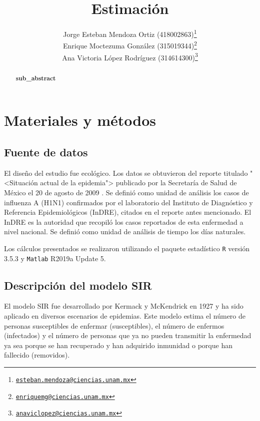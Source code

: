 \documentclass[12pt]{article}
\newcommand{\absdiv}[1]{%
  \par\addvspace{.5\baselineskip}%
  \noindent\textbf{#1}\quad\ignorespaces
}
\begin{document}
	\title{Estimación}
	\author{Jorge Esteban Mendoza Ortiz (418002863)\thanks{\href{mailto:esteban.mendoza@ciencias.unam.mx}{\nolinkurl{esteban.mendoza@ciencias.unam.mx}}} \\
	Enrique Moctezuma González (315019344)\thanks{\href{mailto:enriquemg@ciencias.unam.mx}{\nolinkurl{enriquemg@ciencias.unam.mx}}}\\
	Ana Victoria López Rodríguez (314614300)\thanks{\href{anaviclopez@ciencias.unam.mx}{\nolinkurl{anaviclopez@ciencias.unam.mx}}}}
	\date{}
	\maketitle
	
	\begin{abstract}
	\absdiv{sub\_abstract}
	\end{abstract}
	
	\noindent 
	
	\section{Materiales y métodos}
	\subsection*{Fuente de datos}
	
	El diseño del estudio fue ecológico. Los datos se obtuvieron del reporte titulado "<Situación actual de la epidemia"> publicado por la Secretaría de Salud de México el 20 de agosto de 2009 \cite{Salud2009}. Se definió como unidad de análisis los casos de influenza A (H1N1) confirmados por el laboratorio del Instituto de Diagnóstico y Referencia Epidemiológicos (InDRE), citados en el reporte antes mencionado. El InDRE es la autoridad que recopiló los casos reportados de esta enfermedad a nivel nacional. Se definió como unidad de análisis de tiempo los días naturales.
	
	Los cálculos presentados se realizaron utilizando el paquete estadístico \texttt{R} versión 3.5.3 y \texttt{Matlab} R2019a Update 5.
	
	
	\subsection*{Descripción del modelo SIR}
	
	El modelo SIR fue desarrollado por Kermack y McKendrick en 1927 \cite{Bacaer2011} y ha sido aplicado en diversos escenarios de epidemias. Este modelo estima el número de personas susceptibles de enfermar (susceptibles), el número de enfermos (infectados) y el número de personas que ya no pueden transmitir la enfermedad ya sea porque se han recuperado y han adquirido inmunidad o porque han fallecido (removidos).
	
\end{document}
